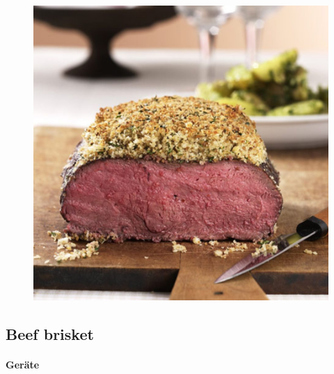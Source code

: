 \begin{figure}[htbp]
	\centering
	\begin{minipage}{1\textwidth}
		\centering
		\includegraphics[width=1\linewidth]{pics/roastbeefmitkraeuterkruste}
		\label{fig:roastbeefmitkraeuterkruste}
	\end{minipage}
\end{figure}
\newpage


\subsection{Beef brisket}

\paragraph{Geräte}

